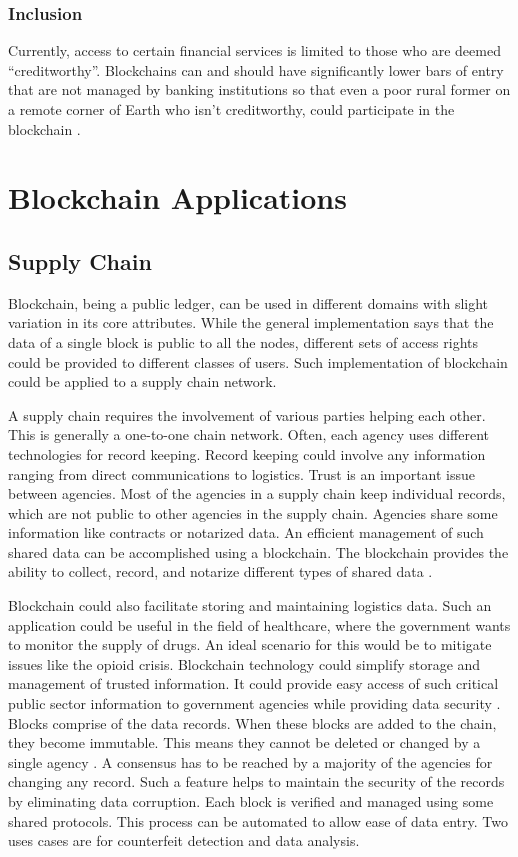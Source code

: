 \documentclass[sigconf]{acmart}
\begin{document}
\subsubsection{Inclusion} Currently, access to certain financial services is limited to those who are deemed ``creditworthy''. Blockchains can and should have significantly lower bars of entry that are not managed by banking institutions so that even a poor rural former on a remote corner of Earth who isn't creditworthy, could participate in the blockchain \cite{tapscott}.

\section{Blockchain Applications}
\subsection{Supply Chain}
Blockchain, being a public ledger, can be used in different domains with slight variation in its core attributes. While the general implementation says that the data of a single block is public to all the nodes, different sets of access rights could be provided to different classes of users.  Such implementation of blockchain could be applied to a supply chain network. 

A supply chain requires the involvement of various parties helping each other. This is generally a one-to-one chain network. Often, each agency uses different technologies for record keeping. Record keeping could involve any information ranging from direct communications to logistics. Trust is an important issue between agencies. Most of the agencies in a supply chain keep individual records, which are not public to other agencies in the supply chain. Agencies share some information like contracts or notarized data. An efficient management of such shared data can be accomplished using a blockchain. The blockchain provides the ability to collect, record, and notarize different types of shared data \cite{arbc1}. 

Blockchain could also facilitate storing and maintaining logistics data. Such an application could be useful in the field of healthcare, where the government wants to monitor the supply of drugs. An ideal scenario for this would be to mitigate issues like the opioid crisis. Blockchain technology could simplify storage and management of trusted information. It could provide easy access of such critical public sector information to government agencies while providing data security \cite{arbc2}. Blocks comprise of the data records. When these blocks are added to the chain, they become immutable. This means they cannot be deleted or changed by a single agency \cite{arbc2}. A consensus has to be reached by a majority of the agencies for changing any record. Such a feature helps to maintain the security of the records by eliminating data corruption. Each block is verified and managed using some shared protocols. This process can be automated to allow ease of data entry. Two uses cases are for counterfeit detection and data analysis.
\end{document}
